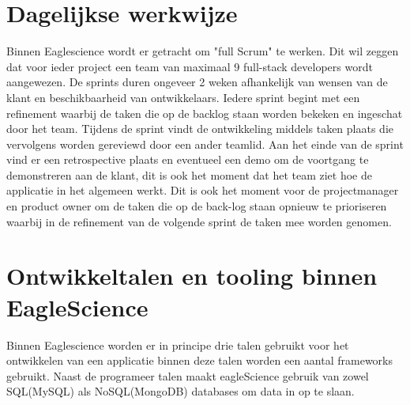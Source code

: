 \section{Dagelijkse werkwijze}\label{sec:dagelijkse-werkwijze}
Binnen Eaglescience wordt er getracht om "full Scrum" te werken.
Dit wil zeggen dat voor ieder project een team van maximaal 9 full-stack developers wordt aangewezen.
De sprints duren ongeveer 2 weken afhankelijk van wensen van de klant en beschikbaarheid van ontwikkelaars.
Iedere sprint begint met een refinement waarbij de taken die op de backlog staan worden bekeken en ingeschat door het team.
Tijdens de sprint vindt de ontwikkeling middels taken plaats die vervolgens worden gereviewd door een ander teamlid.
Aan het einde van de sprint vind er een retrospective plaats en eventueel een demo om de voortgang te demonstreren aan de klant, dit is ook het moment dat het team ziet hoe de applicatie in het algemeen werkt.
Dit is ook het moment voor de projectmanager en product owner om de taken die op de back-log staan opnieuw te prioriseren waarbij in de refinement van de volgende sprint de taken mee worden genomen.

\section{Ontwikkeltalen en tooling binnen EagleScience}\label{sec:ontwikkeltalen-en-tooling-binnen-eaglescience}
Binnen Eaglescience worden er in principe drie talen gebruikt voor het ontwikkelen van een applicatie binnen deze talen worden een aantal frameworks gebruikt.
Naast de programeer talen maakt eagleScience gebruik van zowel SQL(MySQL) als NoSQL(MongoDB) databases om data in op te slaan.

